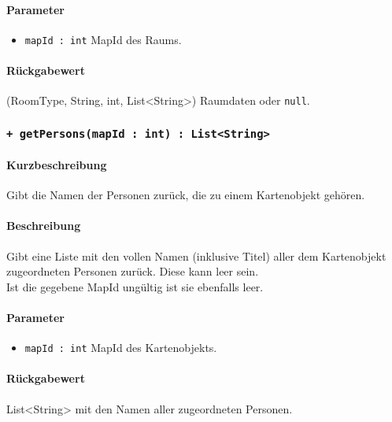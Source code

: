 \paragraph*{Parameter}
\begin{itemize}
    \item \texttt{mapId : int} MapId des Raums.
\end{itemize}
\paragraph*{Rückgabewert}
(RoomType, String, int, List<String>) Raumdaten oder \texttt{null}.

\subsubsection*{\texttt{+ getPersons(mapId : int) : List<String>}}%
\paragraph*{Kurzbeschreibung}
Gibt die Namen der Personen zurück, die zu einem Kartenobjekt gehören.
\paragraph*{Beschreibung}
Gibt eine Liste mit den vollen Namen (inklusive Titel) aller dem Kartenobjekt zugeordneten 
Personen zurück. Diese kann leer sein.\\
Ist die gegebene MapId ungültig ist sie ebenfalls leer.
\paragraph*{Parameter}
\begin{itemize}
    \item \texttt{mapId : int} MapId des Kartenobjekts.
\end{itemize}
\paragraph*{Rückgabewert}
List<String> mit den Namen aller zugeordneten Personen.
